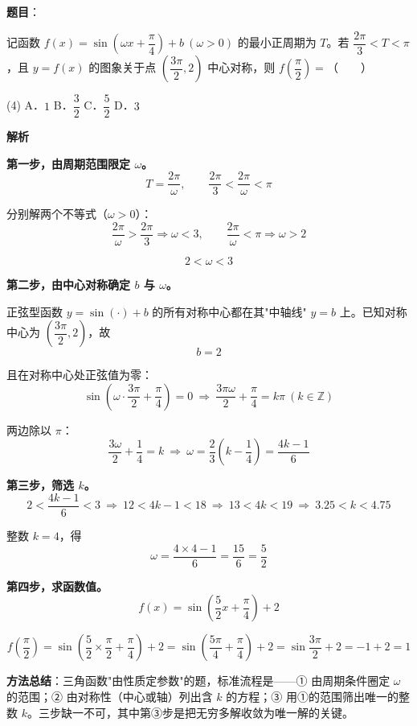 \begin{answer}

\textbf{题目}：

记函数 $f(x)=\sin\left(\omega x+\dfrac\pi4\right)+b\ (\omega>0)$ 的最小正周期为 $T$。若 $\dfrac{2\pi}3<T<\pi$，且 $y=f(x)$ 的图象关于点 $\left(\dfrac{3\pi}2,2\right)$ 中心对称，则 $f\left(\dfrac\pi2\right)=$\mbox{（　　）}

\begin{gkopts}(4)
\task A．$1$
\task B．$\dfrac32$
\task C．$\dfrac52$
\task D．$3$
\end{gkopts}

\textbf{解析}

\textbf{第一步，由周期范围限定 $\omega$。}
\nopagebreak[4]
\[T=\frac{2\pi}\omega,\qquad \frac{2\pi}3<\frac{2\pi}\omega<\pi\]

分别解两个不等式（$\omega>0$）：
\nopagebreak[4]
\[\frac{2\pi}\omega>\frac{2\pi}3\Rightarrow\omega<3,\qquad \frac{2\pi}\omega<\pi\Rightarrow\omega>2\]

\nopagebreak[4]
\[2<\omega<3\]

\textbf{第二步，由中心对称确定 $b$ 与 $\omega$。}

正弦型函数 $y=\sin(\cdot)+b$ 的所有对称中心都在其"中轴线" $y=b$ 上。已知对称中心为 $\left(\dfrac{3\pi}2,2\right)$，故
\nopagebreak[4]
\[b=2\]

且在对称中心处正弦值为零：
\nopagebreak[4]
\[\sin\left(\omega\cdot\frac{3\pi}2+\frac\pi4\right)=0\ \Longrightarrow\ \frac{3\pi\omega}2+\frac\pi4=k\pi\ (k\in\mathbb Z)\]

两边除以 $\pi$：
\nopagebreak[4]
\[\frac{3\omega}2+\frac14=k\ \Longrightarrow\ \omega=\frac{2}{3}\left(k-\frac14\right)=\frac{4k-1}6\]

\textbf{第三步，筛选 $k$。}
\nopagebreak[4]
\[2<\frac{4k-1}6<3\ \Longrightarrow\ 12<4k-1<18\ \Longrightarrow\ 13<4k<19\ \Longrightarrow\ 3.25<k<4.75\]

整数 $k=4$，得
\nopagebreak[4]
\[\omega=\frac{4\times4-1}6=\frac{15}6=\frac52\]

\textbf{第四步，求函数值。}
\nopagebreak[4]
\[f(x)=\sin\left(\frac52x+\frac\pi4\right)+2\]

\nopagebreak[4]
\[f\left(\frac\pi2\right)=\sin\left(\frac52\times\frac\pi2+\frac\pi4\right)+2=\sin\left(\frac{5\pi}4+\frac\pi4\right)+2=\sin\frac{3\pi}2+2=-1+2=1\]

\begin{gktip}
\textbf{方法总结}：三角函数"由性质定参数"的题，标准流程是——① 由周期条件圈定 $\omega$ 的范围；② 由对称性（中心或轴）列出含 $k$ 的方程；③ 用①的范围筛出唯一的整数 $k$。三步缺一不可，其中第③步是把无穷多解收敛为唯一解的关键。
\end{gktip}


\par\medskip

\end{answer}
